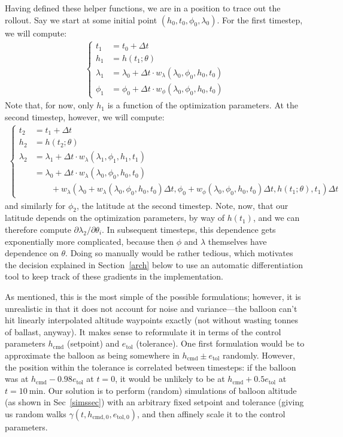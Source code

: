 \documentclass[11pt]{scrartcl} %
\begin{document}
Having defined these helper functions, we are in a position to trace out the rollout. Say we start at some initial point $(h_0, t_0, \phi_0, \lambda_0)$. For the first timestep, we will compute:
\begin{align*}
\begin{cases}
t_1 &= t_0 + \Delta t\\
h_1 &= h(t_1; \theta)\\
\lambda_1 &= \lambda_0 + \Delta t \cdot w_\lambda(\lambda_0, \phi_0, h_0, t_0)\\
\phi_1 &= \phi_0 + \Delta t \cdot w_\phi(\lambda_0, \phi_0, h_0, t_0)
\end{cases}
\end{align*}
Note that, for now, only $h_1$ is a function of the optimization parameters. At the second timestep, however, we will compute:
\begin{align*}
\begin{cases}
t_2 &= t_1 + \Delta t\\
h_2 &= h(t_2; \theta)\\
\lambda_2 &= \lambda_1 + \Delta t \cdot w_\lambda(\lambda_1, \phi_1, h_1, t_1)\\
&=\lambda_0 + \Delta t \cdot w_\lambda(\lambda_0, \phi_0, h_0, t_0) \\
& \qquad + w_\lambda\left(\lambda_0 + w_\lambda(\lambda_0, \phi_0, h_0, t_0) \Delta t, \phi_0 +  w_\phi(\lambda_0, \phi_0, h_0, t_0)\Delta t, h(t_1; \theta), t_1\right)\Delta t 
\end{cases}
\end{align*}
and similarly for $\phi_2$, the latitude at the second timestep. Note, now, that our latitude depends on the optimization parameters, by way of $h(t_1)$, and we can therefore compute $\partial \lambda_2/\partial\theta_i$. In subsequent timesteps, this dependence gets exponentially more complicated, because then $\phi$ and $\lambda$ themselves have dependence on $\theta$. Doing so manually would be rather tedious, which motivates the decision explained in Section~\ref{arch} below to use an automatic differentiation tool to keep track of these gradients in the implementation.

As mentioned, this is the most simple of the possible formulations; however, it is unrealistic in that it does not account for noise and variance---the balloon can't hit linearly interpolated altitude waypoints exactly (not without wasting tonnes of ballast, anyway). It makes sense to reformulate it in terms of the control parameters $h_\text{cmd}$ (setpoint) and $e_\text{tol}$ (tolerance). One first formulation would be to approximate the balloon as being somewhere in $h_\text{cmd}\pm e_\text{tol}$ randomly. However, the position within the tolerance is correlated between timesteps: if the balloon was at $h_\text{cmd} - 0.98e_\text{tol}$ at $t=0$, it would be unlikely to be at $h_\text{cmd} + 0.5e_\text{tol}$ at $t=10~\text{min}$. Our solution is to perform (random) simulations of balloon altitude (as shown in Sec~\ref{simssec}) with an arbitrary fixed setpoint and tolerance (giving us random walks $\gamma(t, h_{\text{cmd},0}, e_{\text{tol},0})$, and then affinely scale it to the control parameters.
\end{document}
